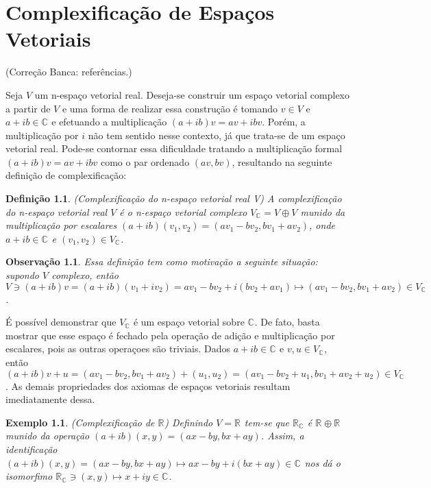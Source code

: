 \documentclass[12pt]{book}
\newtheorem{definicao}[teorema]{Definição}
\newtheorem{exemplo}[teorema]{Exemplo}
\newtheorem{observacao}[teorema]{Observação}
\newcommand{\complexificacao}[1]{#1_{\complexo{}}}
\newcommand{\complexo}[1]{\mathbb{C}^{#1}}
\newcommand{\real}[1]{\mathbb{R}^{#1}}
\newcommand{\reta}{\real{}}
\newcommand{\alerta}[1]{{\color{red}#1}}
\newcommand{\correcaobanca}[1]{\alerta{(Correção Banca: #1)}}
\begin{document}
	\appendix
	
	\chapter{Complexificação de Espaços Vetoriais}\label{apendice_complexificacao_espacos_vetoriais}

	\correcaobanca{referências.}
	
	Seja $V$ um n-espaço vetorial real. Deseja-se construir um espaço vetorial complexo a partir de $V$ e uma forma de realizar essa construção é tomando $v \in V $ e $a+ib \in \complexo{}$ e efetuando a multiplicação $(a+ib)v = av+ibv$. Porém, a multiplicação por $i$ não tem sentido nesse contexto, já que trata-se de um espaço vetorial real. Pode-se contornar essa dificuldade tratando a multiplicação formal $(a+ib)v = av+ibv$ como o par ordenado $(av, bv)$, resultando na seguinte definição de complexificação:
	
	\begin{definicao}
		(Complexificação do n-espaço vetorial real V) A complexificação do n-espaço vetorial real $V$ é o n-espaço vetorial complexo $\complexificacao{V}=V\oplus V$ munido da multiplicação por escalares $(a+ib)(v_{1}, v_{2}) = (av_{1}-bv_{2}, bv_{1}+ av_{2})$, onde $a+ib \in \complexo{}$ e $(v_{1}, v_{2})\in \complexificacao{V}$.
	\end{definicao}
	
	\begin{observacao}
		Essa definição tem como motivação a seguinte situação: supondo $V$ complexo, então $V \ni (a+ib)v = (a+ib)(v_{1}+iv_{2}) = av_{1}-bv_{2}+i(bv_{2}+av_{1}) \mapsto (av_{1}-bv_{2}, bv_{1}+ av_{2}) \in \complexificacao{V}$.
	\end{observacao}
	
	É possível demonstrar que $\complexificacao{V}$ é um espaço vetorial sobre $\complexo{}$. De fato, basta mostrar que esse espaço é fechado pela operação de adição e multiplicação por escalares, pois as outras operaçoes são triviais. Dados $a+ib \in \complexo{}$ e $v,u \in \complexificacao{V}$, então $(a+ib )v+u = (av_{1}-bv_{2}, bv_{1}+ av_{2}) + (u_{1}, u_{2}) = (av_{1}-bv_{2} + u_{1}, bv_{1}+ av_{2} + u_{2}) \in \complexificacao{V}$. As demais propriedades dos axiomas de espaços vetoriais resultam imediatamente dessa.
	
	\begin{exemplo}\label{exemplo_conjugado_reta_real}
		(Complexificação de $\reta$) Definindo $V = \reta$ tem-se que $\complexificacao{\reta}$ é $\reta\oplus \reta$ munido da operação $(a+ib)(x,y) = (ax-by, bx+ay)$. Assim, a identificação $(a+ib)(x, y ) = (ax-by, bx+ay) \mapsto ax-by+i(bx+ay) \in \complexo{}$ nos dá o isomorfimo $\complexificacao{\reta} \ni (x,y)\mapsto x +iy\in \complexo{}$.
	\end{exemplo}
	
\end{document}
